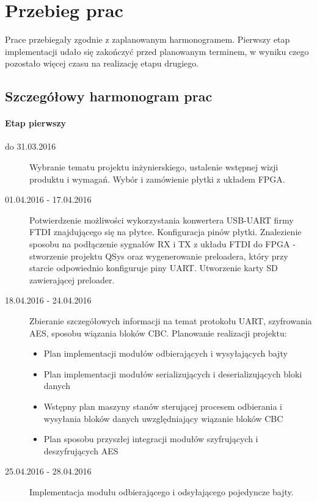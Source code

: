 \section{Przebieg prac}
\label{sec:przebieg-prac}
Prace przebiegały zgodnie z zaplanowanym harmonogramem. Pierwszy etap implementacji udało się zakończyć przed planowanym terminem, w wyniku czego pozostało więcej czasu na realizację etapu drugiego.

\subsection{Szczegółowy harmonogram prac}
\paragraph{Etap pierwszy}
\begin{description}
\item[do 31.03.2016] Wybranie tematu projektu inżynierskiego, ustalenie wstępnej wizji produktu i wymagań. Wybór i zamówienie płytki z układem FPGA.

\item[01.04.2016 - 17.04.2016] Potwierdzenie możliwości wykorzystania konwertera USB-UART firmy FTDI znajdującego się na płytce. Konfiguracja pinów płytki. Znalezienie sposobu na podłączenie sygnałów RX i TX z układu FTDI do FPGA - stworzenie projektu QSys oraz wygenerowanie preloadera, który przy starcie odpowiednio konfiguruje piny UART. Utworzenie karty SD zawierającej preloader.

\item[18.04.2016 - 24.04.2016] Zbieranie szczegółowych informacji na temat protokołu UART, szyfrowania AES, sposobu wiązania bloków CBC. Planowanie realizacji projektu:
	\begin{itemize}[noitemsep,nolistsep]
	\item Plan implementacji modułów odbierających i wysyłających bajty
	\item Plan implementacji modułów serializujących i deserializujących bloki danych
	\item Wstępny plan maszyny stanów sterującej procesem odbierania i wysyłania bloków danych uwzględniający wiązanie bloków CBC
	\item Plan sposobu przyszłej integracji modułów szyfrujących i deszyfrujących AES
	\end{itemize}

\item[25.04.2016 - 28.04.2016] Implementacja modułu odbierającego i odsyłającego pojedyncze bajty.


\end{description}
